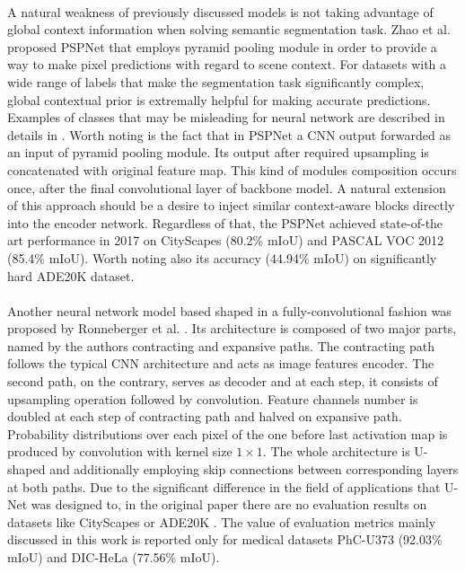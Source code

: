 \documentclass{article}
\begin{document}
\paragraph{}
A natural weakness of previously discussed models is not taking advantage of global context information when solving semantic segmentation task. Zhao et al. proposed PSPNet \cite{psp} that employs pyramid pooling module in order to provide a way to make pixel predictions with regard to scene context. For datasets with a wide range of labels that make the segmentation task significantly complex, global contextual prior is extremally helpful for making accurate predictions. Examples of classes that may be misleading for neural network are described in details in \cite{psp}. Worth noting is the fact that in PSPNet \cite{psp} a CNN output forwarded as an input of pyramid pooling module. Its output after required upsampling is concatenated with original feature map. This kind of modules composition occurs once, after the final convolutional layer of backbone model. A natural extension of this approach should be a desire to inject similar context-aware blocks directly into the encoder network. Regardless of that, the PSPNet \cite{psp} achieved state-of-the art performance in 2017 on CityScapes \cite{cityscapes} (80.2\% mIoU) and PASCAL VOC 2012 \cite{pascal_voc} (85.4\% mIoU). Worth noting also its accuracy (44.94\% mIoU) on significantly hard ADE20K \cite{ade20k} dataset.
\paragraph{}
Another neural network model based shaped in a fully-convolutional fashion was proposed by Ronneberger et al. \cite{unet}. Its architecture is composed of two major parts, named by the authors contracting and expansive paths. The contracting path follows the typical CNN architecture and acts as image features encoder. The second path, on the contrary, serves as decoder and at each step, it consists of upsampling operation followed by convolution. Feature channels number is doubled at each step of contracting path and halved on expansive path. Probability distributions over each pixel of the one before last activation map is produced by convolution with kernel size $1 \times 1$. The whole architecture is U-shaped and additionally employing skip connections between corresponding layers at both paths. Due to the significant difference in the field of applications that U-Net \cite{unet} was designed to, in the original paper there are no evaluation results on datasets like CityScapes \cite{cityscapes} or ADE20K \cite{ade20k}. The value of evaluation metrics mainly discussed in this work is reported only for medical datasets PhC-U373 \cite{phcu373} (92.03\% mIoU) and DIC-HeLa \cite{dichela} (77.56\% mIoU).
\end{document}
